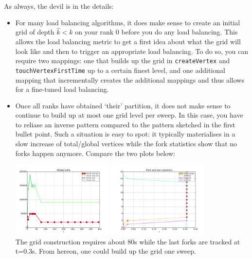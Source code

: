 As always, the devil is in the details:
\begin{itemize}
  \item  For many load balancing algorithms, it does make sense to create an
  initial grid of depth $\hat k <k$ on your rank 0 before you do any load
  balancing. This allows the load balancing metric to get a first idea about
  what the grid will look like and then to trigger an appropriate load
  balancing. To do so, you can require two mappings: one that builds up the grid
  in \texttt{createVertex} and \texttt{touchVertexFirstTime} up to a certain
  finest level, and one additional mapping that incrementally creates the
  additional mappings and thus allows for a fine-tuned load balancing.
  \item Once all ranks have obtained `their' partition, it does not make sense
  to continue to build up at most one grid level per sweep. In this case, you
  have to reliase an inverse pattern compared to the pattern sketched in the
  first bullet point. Such a situation is easy to spot: it typically
  materialises in a slow increase of total/global vertices while the fork
  statistics show that no forks happen anymore. Compare the two plots below:
  \begin{center}
    \includegraphics[width=0.4\textwidth]{41_mpi-setup/grid-construction.pdf}
    \includegraphics[width=0.4\textwidth]{41_mpi-setup/fork-behaviour.pdf}
    \\
    {
    \footnotesize
    The grid construction requires about 80s while the last forks are tracked
    at t=0.3s. From hereon, one could build up the grid one sweep.
    }
  \end{center}
  \begin{remark}

\end{remark}
\end{itemize}
